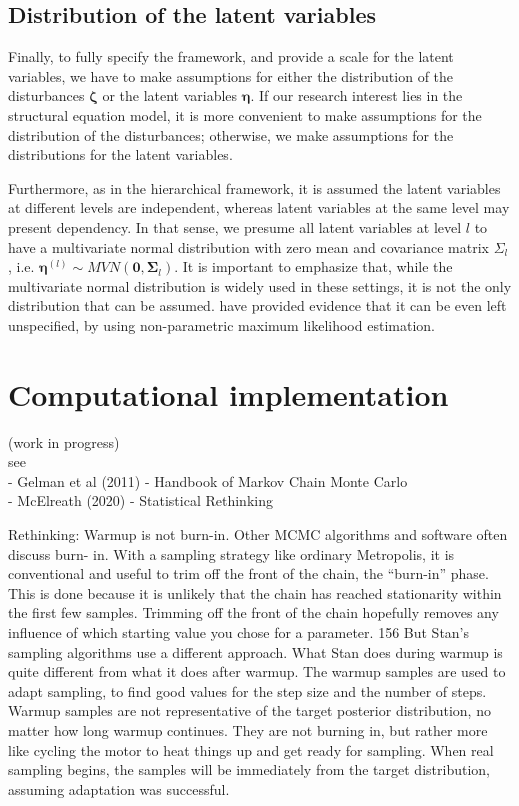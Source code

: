 \subsection{Distribution of the latent variables} \label{s_sect:dist_lv}
Finally, to fully specify the framework, and provide a scale for the latent variables, we have to make assumptions for either the distribution of the disturbances $\pmb{\zeta}$ or the latent variables $\pmb{\eta}$. If our research interest lies in the structural equation model, it is more convenient to make assumptions for the distribution of the disturbances; otherwise, we make assumptions for the distributions for the latent variables. 

Furthermore, as in the hierarchical framework, it is assumed the latent variables at different levels are independent, whereas latent variables at the same level may present dependency. In that sense, we presume all latent variables at level $l$ to have a multivariate normal distribution with zero mean and covariance matrix $\Sigma_{l}$, i.e. $\pmb{\eta}^{(l)} \sim MVN(\mathbf{0}, \pmb{\Sigma}_{l})$. It is important to emphasize that, while the multivariate normal distribution is widely used in these settings, it is not the only distribution that can be assumed. \citet{Rabe_et_al_2003a} have provided evidence that it can be even left unspecified, by using non-parametric maximum likelihood estimation.



\section{Computational implementation} \label{sect:comp_imp}

{\color{red} (work in progress) \\
	see \\
	- Gelman et al (2011) - Handbook of Markov Chain Monte Carlo\\
	- McElreath (2020) - Statistical Rethinking
	
	Rethinking: Warmup is not burn-in. Other MCMC algorithms and software often discuss burn-
	in. With a sampling strategy like ordinary Metropolis, it is conventional and useful to trim off the
	front of the chain, the “burn-in” phase. This is done because it is unlikely that the chain has reached
	stationarity within the first few samples. Trimming off the front of the chain hopefully removes any
	influence of which starting value you chose for a parameter. 156
	But Stan’s sampling algorithms use a different approach. What Stan does during warmup is quite
	different from what it does after warmup. The warmup samples are used to adapt sampling, to find
	good values for the step size and the number of steps. Warmup samples are not representative of
	the target posterior distribution, no matter how long warmup continues. They are not burning in,
	but rather more like cycling the motor to heat things up and get ready for sampling. When real
	sampling begins, the samples will be immediately from the target distribution, assuming adaptation
	was successful.
	
}

